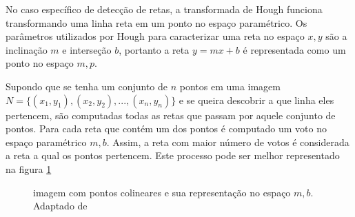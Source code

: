 
No caso específico de detecção de retas, a transformada de Hough funciona transformando uma linha reta em um ponto no espaço paramétrico. Os parâmetros utilizados por Hough para caracterizar uma reta no espaço $x,y$ são a inclinação $m$ e interseção $b$, portanto a reta $y = mx+b$ é representada como um ponto no espaço $m,p$.

Supondo que se tenha um conjunto de $n$ pontos em uma imagem $N = \{(x_1,y_1),(x_2,y_2),...,(x_n,y_n)\}$  e se queira descobrir a que linha eles pertencem, são computadas todas as retas que passam por aquele conjunto de pontos. Para cada reta que contém um dos pontos é computado um voto no espaço paramétrico $m,b$. Assim, a reta com maior número de votos é considerada a reta a qual os pontos pertencem. Este processo pode ser melhor representado na figura \ref{houghpuro}

\begin{figure}[h]
  \centering
  \hfill
  \caption{imagem com pontos colineares e sua representação no espaço $m,b$. Adaptado de \cite{houghintro01}}
  \label{houghpuro}
\end{figure}

